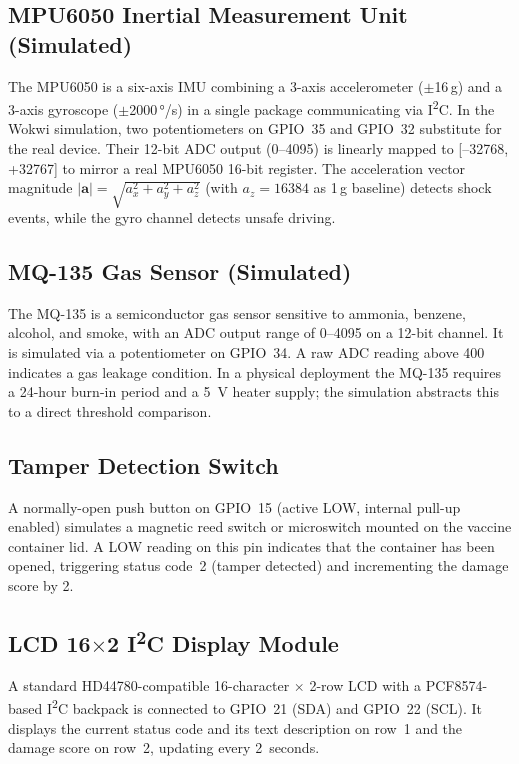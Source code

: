 \documentclass[12pt, a4paper]{article}
\begin{document}
\subsection{MPU6050 Inertial Measurement Unit (Simulated)}

The MPU6050 is a six-axis IMU combining a 3-axis accelerometer ($\pm$16\,g) and a 3-axis gyroscope ($\pm$2000\,°/s) in a single package communicating via I\textsuperscript{2}C. In the Wokwi simulation, two potentiometers on GPIO~35 and GPIO~32 substitute for the real device. Their 12-bit ADC output (0--4095) is linearly mapped to [--32768, +32767] to mirror a real MPU6050 16-bit register. The acceleration vector magnitude $|\mathbf{a}| = \sqrt{a_x^2 + a_y^2 + a_z^2}$ (with $a_z = 16384$ as 1\,g baseline) detects shock events, while the gyro channel detects unsafe driving.

\subsection{MQ-135 Gas Sensor (Simulated)}

The MQ-135 is a semiconductor gas sensor sensitive to ammonia, benzene, alcohol, and smoke, with an ADC output range of 0--4095 on a 12-bit channel. It is simulated via a potentiometer on GPIO~34. A raw ADC reading above 400 indicates a gas leakage condition. In a physical deployment the MQ-135 requires a 24-hour burn-in period and a 5~V heater supply; the simulation abstracts this to a direct threshold comparison.

\subsection{Tamper Detection Switch}

A normally-open push button on GPIO~15 (active LOW, internal pull-up enabled) simulates a magnetic reed switch or microswitch mounted on the vaccine container lid. A LOW reading on this pin indicates that the container has been opened, triggering status code~2 (tamper detected) and incrementing the damage score by 2.

\subsection{LCD 16$\times$2 I\textsuperscript{2}C Display Module}

A standard HD44780-compatible 16-character $\times$ 2-row LCD with a PCF8574-based I\textsuperscript{2}C backpack is connected to GPIO~21 (SDA) and GPIO~22 (SCL). It displays the current status code and its text description on row~1 and the damage score on row~2, updating every 2~seconds.
\end{document}
